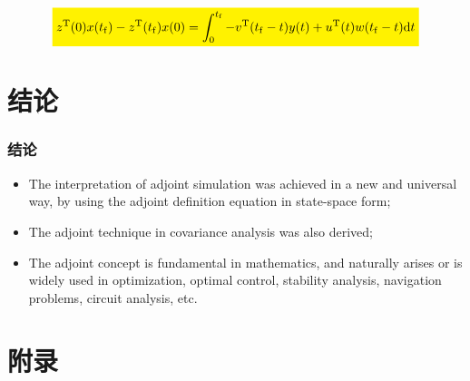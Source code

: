 \documentclass[12pt,xcolor={table},aspectratio=169]{beamer}
\begin{document}
\begin{frame}
\begin{columns}
\begin{column}[c]{0.4\paperwidth}
\begin{minipage}[c][0.6\textheight][c]{\linewidth}
\begin{figure}
\end{figure}
\end{minipage}
  \end{column}
  \end{columns}
    \footnotesize
\begin{equation}
\highlightmath{
z^{\mathrm{T}}(0)x(t_{\mathrm{f}}) - z^{\mathrm{T}}(t_{\mathrm{f}})x(0) = \int_{0}^{t_{\mathrm{f}}} -v^{\mathrm{T}}(t_{\mathrm{f}} - t)y(t)+ u^{\mathrm{T}}(t)w(t_{\mathrm{f}}-t) \mathrm{d}t }
\end{equation}
\end{frame}

\section[结论]{结\quad 论}
\begin{frame}
    \frametitle{结\quad 论}
    \begin{itemize}
  \setlength{\itemsep}{10pt}
    \item The interpretation of adjoint simulation was achieved in a new and universal way, by using the adjoint definition equation in state-space form;
    \item The adjoint technique in covariance analysis was also derived;
    \item The adjoint concept is fundamental in mathematics, and naturally arises or is widely used in optimization, optimal control, stability analysis, navigation problems, circuit analysis, etc.
  \end{itemize}

\end{frame}






\section[附录]{附录}
\end{document}
